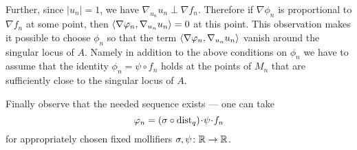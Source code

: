 Further, since $|u_n|=1$, we have $\nabla_{u_n} u_n\perp \nabla f_n$.
Therefore if $\nabla \phi_n$ is proportional to $\nabla f_n$ at some point, then $\langle\nabla\varphi_n,\nabla_{u_n} {u_n}\rangle=0$ at this point.
This observation makes it possible to choose $\phi_n$ so that the term $\langle\nabla\varphi_n,\nabla_{u_n} {u_n}\rangle$ vanish around the singular locus of $A$.
Namely in addition to the above conditions on $\phi_n$ we have to assume that the identity $\phi_n=\psi\circ f_n$ holds at the points of $M_n$ that are sufficiently close to the singular locus of $A$.

Finally observe that the needed sequence exists ---
one can take 
\[\phi_n=(\sigma\circ \dist_q)\cdot \psi\cdot f_n\]
for appropriately chosen fixed mollifiers $\sigma,\psi\colon\mathbb{R}\to \mathbb{R}$.
\qeds


